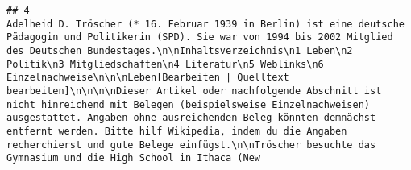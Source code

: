 \documentclass[
]{article}
\begin{document}
\begin{verbatim}
## 4                                                                                                                                                                                                                                                                                                                                                                                                                                                                                                                                                                                                                                                                                                                                                                                                                                                                                                                                                                                                                                                                                                                                                                                                                                                                                                                                                                                                                                                                                                                                                                                                                                                                                                                                                                                                                                                                                                                                                                                                                                                                                                                                                                                                                                                                                                                                                                                                                                                                                                                                                                                                                                                                                                                                                     Adelheid D. Tröscher (* 16. Februar 1939 in Berlin) ist eine deutsche Pädagogin und Politikerin (SPD). Sie war von 1994 bis 2002 Mitglied des Deutschen Bundestages.\n\nInhaltsverzeichnis\n1 Leben\n2 Politik\n3 Mitgliedschaften\n4 Literatur\n5 Weblinks\n6 Einzelnachweise\n\n\nLeben[Bearbeiten | Quelltext bearbeiten]\n\n\n\nDieser Artikel oder nachfolgende Abschnitt ist nicht hinreichend mit Belegen (beispielsweise Einzelnachweisen) ausgestattet. Angaben ohne ausreichenden Beleg könnten demnächst entfernt werden. Bitte hilf Wikipedia, indem du die Angaben recherchierst und gute Belege einfügst.\n\nTröscher besuchte das Gymnasium und die High School in Ithaca (New 
\end{verbatim}
\end{document}

